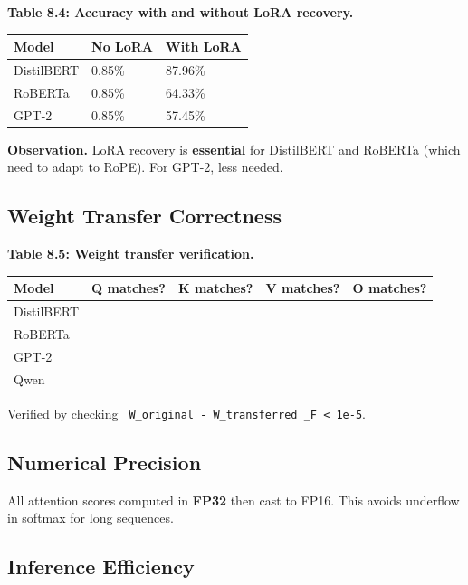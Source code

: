 \textbf{Table 8.4: Accuracy with and without LoRA recovery.}

\begin{table}[H]
\centering
\small
\begin{tabular}{lll}
\toprule
\textbf{Model} & \textbf{No LoRA} & \textbf{With LoRA} \\
\midrule
DistilBERT & 0.85\% & 87.96\% \\
RoBERTa & 0.85\% & 64.33\% \\
GPT-2 & 0.85\% & 57.45\% \\
\bottomrule
\end{tabular}
\end{table}

\textbf{Observation.} LoRA recovery is \textbf{essential} for DistilBERT and 
RoBERTa (which need to adapt to RoPE). For GPT-2, less needed.

\subsection{Weight Transfer Correctness}

\textbf{Table 8.5: Weight transfer verification.}

\begin{table}[H]
\centering
\small
\begin{tabular}{lllll}
\toprule
\textbf{Model} & \textbf{Q matches?} & \textbf{K matches?} & \textbf{V matches?} & \textbf{O matches?} \\
\midrule
DistilBERT &  &  &  &  \\
RoBERTa &  &  &  &  \\
GPT-2 &  &  &  &  \\
Qwen &  &  &  &  \\
\bottomrule
\end{tabular}
\end{table}

Verified by checking \texttt{ W\_original - W\_transferred \_F < 1e-5}.

\subsection{Numerical Precision}

All attention scores computed in \textbf{FP32} then cast to FP16. This avoids 
underflow in softmax for long sequences.

\subsection{Inference Efficiency}

